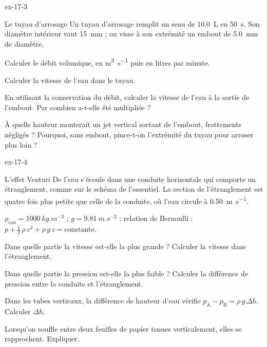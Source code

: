\begin{blocLivre}{ex-17-3}
\begin{exercice}[1]{Le tuyau d'arrosage}
Un tuyau d'arrosage remplit un seau de \qty{10,0}{L} en \qty{50}{s}. Son diamètre intérieur vaut \qty{15}{mm} ; on
visse à son extrémité un embout de \qty{5,0}{mm} de diamètre.
\begin{questions}
\item Calculer le débit volumique, en \unit{m^3.s^{-1}} puis en litres par minute.
\item Calculer la vitesse de l'eau dans le tuyau.
\item En utilisant la conservation du débit, calculer la vitesse de l'eau à la sortie de l'embout. Par combien
a-t-elle été multipliée ?
\item À quelle hauteur monterait un jet vertical sortant de l'embout, frottements négligés ? Pourquoi, sans embout,
pince-t-on l'extrémité du tuyau pour arroser plus loin ?
\end{questions}
\end{exercice}
\end{blocLivre}
\begin{blocLivre}{ex-17-4}
\begin{exercice}[1]{L'effet Venturi}
De l'eau s'écoule dans une conduite horizontale qui comporte un étranglement, comme sur le schéma de l'essentiel. La
section de l'étranglement est quatre fois plus petite que celle de la conduite, où l'eau circule à
\qty{0,50}{m.s^{-1}}.
\begin{donnees}
$\rho_\mathrm{eau}=\qty{1000}{kg.m^{-3}}$ ; $g=\qty{9,81}{m.s^{-2}}$ ; relation de Bernoulli :
$p+\frac12\,\rho\,v^2+\rho\,g\,z=\text{constante}$.
\end{donnees}
\begin{questions}
\item Dans quelle partie la vitesse est-elle la plus grande ? Calculer la vitesse dans l'étranglement.
\item Dans quelle partie la pression est-elle la plus faible ? Calculer la différence de pression entre la conduite et
l'étranglement.
\item Dans les tubes verticaux, la différence de hauteur d'eau vérifie $p_\mathrm{A}-p_\mathrm{B}=\rho\,g\,\Delta h$.
Calculer $\Delta h$.
\item Lorsqu'on souffle entre deux feuilles de papier tenues verticalement, elles se rapprochent. Expliquer.
\end{questions}
\end{exercice}
\end{blocLivre}
